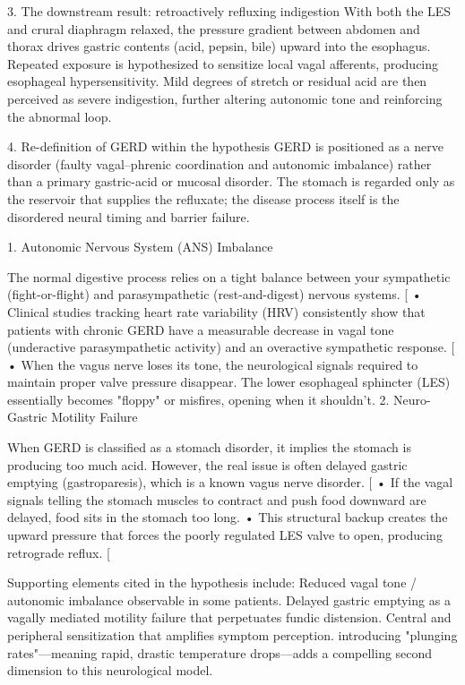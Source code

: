 3. The downstream result: retroactively refluxing indigestion
With both the LES and crural diaphragm relaxed, the pressure gradient between abdomen and thorax drives gastric contents (acid, pepsin, bile) upward into the esophagus.  
Repeated exposure is hypothesized to sensitize local vagal afferents, producing esophageal hypersensitivity. Mild degrees of stretch or residual acid are then perceived as severe indigestion, further altering autonomic tone and reinforcing the abnormal loop.

4. Re-definition of GERD within the hypothesis
GERD is positioned as a nerve disorder (faulty vagal–phrenic coordination and autonomic imbalance) rather than a primary gastric-acid or mucosal disorder. The stomach is regarded only as the reservoir that supplies the refluxate; the disease process itself is the disordered neural timing and barrier failure.

1. Autonomic Nervous System (ANS) Imbalance

The normal digestive process relies on a tight balance between your sympathetic (fight-or-flight) and parasympathetic (rest-and-digest) nervous systems. [
• Clinical studies tracking heart rate variability (HRV) consistently show that patients with chronic GERD have a measurable decrease in vagal tone (underactive parasympathetic activity) and an overactive sympathetic response. [
• When the vagus nerve loses its tone, the neurological signals required to maintain proper valve pressure disappear. The lower esophageal sphincter (LES) essentially becomes "floppy" or misfires, opening when it shouldn't. 
2. Neuro-Gastric Motility Failure

When GERD is classified as a stomach disorder, it implies the stomach is producing too much acid. However, the real issue is often delayed gastric emptying (gastroparesis), which is a known vagus nerve disorder. [
• If the vagal signals telling the stomach muscles to contract and push food downward are delayed, food sits in the stomach too long.
• This structural backup creates the upward pressure that forces the poorly regulated LES valve to open, producing retrograde reflux. [

Supporting elements cited in the hypothesis include:  
Reduced vagal tone / autonomic imbalance observable in some patients.  
Delayed gastric emptying as a vagally mediated motility failure that perpetuates fundic distension.  
Central and peripheral sensitization that amplifies symptom perception.
introducing "plunging rates"—meaning rapid, drastic temperature drops—adds a compelling second dimension to this neurological model.

